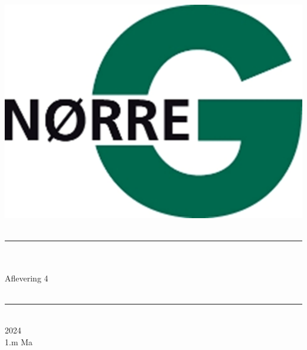 \documentclass[12pt,x11names,a4paper]{article}
\begin{document}
%

\begin{titlepage}

\begin{minipage}{0.27\textwidth}

\end{minipage}
\begin{minipage}{0.73\textwidth}
\begin{center}
\phantom{h} \vspace{1cm}\\
\hspace{4cm}
\includegraphics[scale = 1]{Billeder/Norreg.png} \\
\phantom{h} \vspace{5cm}\\
\rule{0.7\textwidth}{0.3mm}\\
\phantom{h}\\
{\fontsize{50}{60}\selectfont Aflevering 4}\\
\phantom{h}\\
\rule{0.7\textwidth}{0.3mm}\\
\Large 2024\\
\Large 1.m Ma

\end{center}
\end{minipage}
\end{titlepage}
\end{document}
